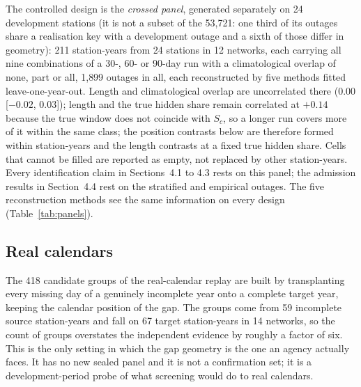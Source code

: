 \documentclass[draft]{agujournal2025}
\begin{document}
The controlled design is the \emph{crossed panel}, generated separately on 24
development stations (it is not a subset of the 53{,}721: one third of its
outages share a realisation key with a development outage and a sixth of those
differ in geometry): 211 station-years from 24 stations in 12 networks, each
carrying all nine combinations of a 30-, 60- or 90-day run with a climatological
overlap of none, part or all, 1{,}899 outages in all, each reconstructed by five
methods fitted leave-one-year-out. Length and
climatological overlap are uncorrelated there ($0.00$ [$-0.02$, 0.03]); length
and the true hidden share remain correlated at $+0.14$ because the true window
does not coincide with $S_c$, so a longer run covers more of it within the same
class; the position contrasts below are therefore formed within station-years and
the length contrasts at a fixed true hidden share. Cells that cannot be filled are
reported as empty, not replaced by other station-years. Every identification claim
in Sections~4.1 to 4.3 rests on this panel; the admission results in
Section~4.4 rest on the stratified and empirical outages. The five reconstruction
methods see the same information on every design (Table~\ref{tab:panels}).

\subsection{Real calendars}

The 418 candidate groups of the real-calendar replay are built by transplanting
every missing day of a genuinely incomplete year onto a complete target year,
keeping the calendar position of the gap. The groups come from 59 incomplete
source station-years and fall on 67 target station-years in 14 networks, so the
count of groups overstates the independent evidence by roughly a factor of six.
This is the only setting in which the gap geometry is the one an agency actually
faces. It has no new sealed panel and it is not a confirmation set; it is a
development-period probe of what screening would do to real calendars.
\end{document}
